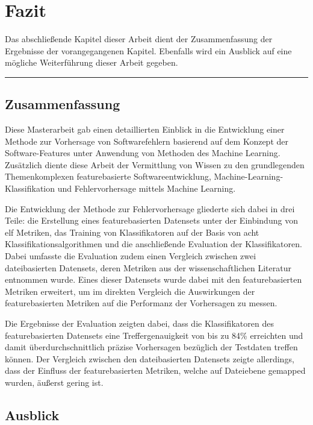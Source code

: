 
\chapter{Fazit}
\label{conclusion}

Das abschließende Kapitel dieser Arbeit dient der Zusammenfassung der Ergebnisse der vorangegangenen Kapitel. Ebenfalls wird ein Ausblick auf eine mögliche Weiterführung dieser Arbeit gegeben.
\\
\hrule

\section{Zusammenfassung}
Diese Masterarbeit gab einen detaillierten Einblick in die Entwicklung einer Methode zur Vorhersage von Softwarefehlern basierend auf dem Konzept der Software-Features unter Anwendung von Methoden des Machine Learning. Zusätzlich diente diese Arbeit der Vermittlung von Wissen zu den grundlegenden Themenkomplexen \glqq featurebasierte Softwareentwicklung\grqq{}, \glqq Machine-Learning-Klassifikation\grqq{} und \glqq Fehlervorhersage mittels Machine Learning\grqq.

Die Entwicklung der Methode zur Fehlervorhersage gliederte sich dabei in drei Teile: die Erstellung eines featurebasierten Datensets unter der Einbindung von elf Metriken, das Training von Klassifikatoren auf der Basis von acht Klassifikationsalgorithmen und die anschließende Evaluation der Klassifikatoren. Dabei umfasste die Evaluation zudem einen Vergleich zwischen zwei dateibasierten Datensets, deren Metriken aus der wissenschaftlichen Literatur entnommen wurde. Eines dieser Datensets wurde dabei mit den featurebasierten Metriken erweitert, um im direkten Vergleich die Auswirkungen der featurebasierten Metriken auf die Performanz der Vorhersagen zu messen.

Die Ergebnisse der Evaluation zeigten dabei, dass die Klassifikatoren des featurebasierten Datensets eine Treffergenauigkeit von bis zu 84\% erreichten und damit überdurchschnittlich präzise Vorhersagen bezüglich der Testdaten treffen können. Der Vergleich zwischen den dateibasierten Datensets zeigte allerdings, dass der Einfluss der featurebasierten Metriken, welche auf Dateiebene gemapped wurden, äußerst gering ist. 

\section{Ausblick}

